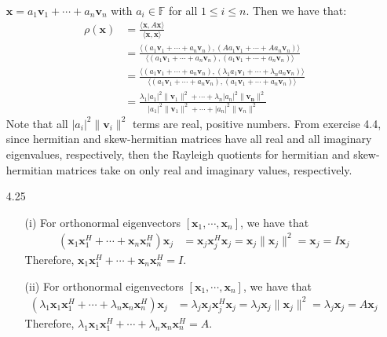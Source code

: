 \documentclass[letterpaper,12pt]{article}
\theoremstyle{definition}
\begin{document}
\begin{enumerate}
    $\mathbf{x}=a_1\mathbf{v}_1+\cdots+a_n\mathbf{v}_n$ with $a_i \in \mathbb{F}$ for all $1 \leq i \leq n$. Then we have that:
    \begin{align*}
      \rho(\mathbf{x}) &= \frac{\langle \mathbf{x},A\mathbf{x}\rangle}{\langle \mathbf{x},\mathbf{x}\rangle} \\
      &= \frac{\langle (a_1\mathbf{v}_1+\cdots+a_n\mathbf{v}_n),(Aa_1\mathbf{v}_1+\cdots+Aa_n\mathbf{v}_n)\rangle}{\langle (a_1\mathbf{v}_1+\cdots+a_n\mathbf{v}_n),(a_1\mathbf{v}_1+\cdots+a_n\mathbf{v}_n)\rangle} \\
      &= \frac{\langle (a_1\mathbf{v}_1+\cdots+a_n\mathbf{v}_n),(\lambda_1a_1\mathbf{v}_1+\cdots+\lambda_na_n\mathbf{v}_n)\rangle}{\langle (a_1\mathbf{v}_1+\cdots+a_n\mathbf{v}_n),(a_1\mathbf{v}_1+\cdots+a_n\mathbf{v}_n)\rangle} \\
      &= \frac{\lambda_1|a_1|^2\|\mathbf{v}_1\|^2+\cdots+\lambda_n|a_n|^2\|\mathbf{v_n}\|^2}{|a_1|^2\|\mathbf{v}_1\|^2+\cdots+|a_n|^2\|\mathbf{v}_n\|^2}
    \end{align*}
    Note that all $|a_i|^2\|\mathbf{v}_i\|^2$ terms are real, positive numbers. From exercise 4.4, since hermitian and skew-hermitian matrices have all real and all imaginary eigenvalues, respectively, then the Rayleigh quotients for hermitian and skew-hermitian matrices take on only real and imaginary values, respectively.
  \item[4.25]
    \begin{enumerate}
      \item[(i)]
        For orthonormal eigenvectors $[\mathbf{x}_1,\cdots,\mathbf{x}_n]$, we have that
        \begin{align*}
          (\mathbf{x}_1\mathbf{x}_1^H+\cdots+\mathbf{x}_n\mathbf{x}_n^H)\mathbf{x}_j &= \mathbf{x}_j\mathbf{x}_j^H\mathbf{x}_j = \mathbf{x}_j\|\mathbf{x}_j\|^2 = \mathbf{x}_j = I\mathbf{x}_j
        \end{align*}
        Therefore, $\mathbf{x}_1\mathbf{x}_1^H+\cdots+\mathbf{x}_n\mathbf{x}_n^H = I$.
      \item[(ii)]
      For orthonormal eigenvectors $[\mathbf{x}_1,\cdots,\mathbf{x}_n]$, we have that
      \begin{align*}
        (\lambda_1\mathbf{x}_1\mathbf{x}_1^H+\cdots+\lambda_n\mathbf{x}_n\mathbf{x}_n^H)\mathbf{x}_j &= \lambda_j\mathbf{x}_j\mathbf{x}_j^H\mathbf{x}_j = \lambda_j\mathbf{x}_j\|\mathbf{x}_j\|^2 = \lambda_j\mathbf{x}_j = A\mathbf{x}_j
      \end{align*}
      Therefore, $\lambda_1\mathbf{x}_1\mathbf{x}_1^H+\cdots+\lambda_n\mathbf{x}_n\mathbf{x}_n^H = A$.

\end{enumerate}
\end{enumerate}
\end{document}
